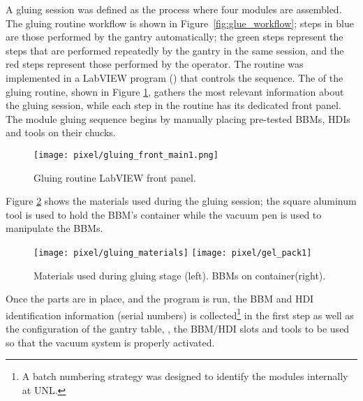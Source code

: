 A gluing session was defined as the process where four modules are assembled. The gluing routine workflow is shown in Figure~\ref{fig:glue_workflow}; steps in blue are those performed by the gantry automatically; the green steps represent the steps that are performed repeatedly by the gantry in the same session, and the red steps represent those performed by the operator. The routine was implemented in a LabVIEW program () that controls the sequence. The  of the gluing routine, shown in Figure \ref{fig:gluing_front_main}, gathers the most relevant information about the gluing session, while each step in the routine has its dedicated front panel. The module gluing sequence begins by manually placing pre-tested BBMs, HDIs and tools on their chucks.

\begin{landscape}
\begin{figure}[h]
  \centering
    \vspace{-2.5cm}
    \hspace{-1cm}
    \texttt{[image: pixel/gluing\_front\_main1.png]}
    \caption[Gluing routine LabVIEW front panel]{Gluing routine LabVIEW front panel.}\label{fig:gluing_front_main}
    \vspace{-2cm}
    \hspace{-2cm}
\end{figure}
\end{landscape}

Figure \ref{fig:gluing_materials} shows the materials used during the gluing session; the square aluminum tool is used to hold the BBM's container while the vacuum pen is used to manipulate the BBMs.

\begin{figure}[h]
\centering
  \texttt{[image: pixel/gluing\_materials]}
  \texttt{[image: pixel/gel\_pack1]}
 \caption[Materials used during gluing stage]{Materials used during gluing stage (left). BBMs on container(right).}\label{fig:gluing_materials}
\end{figure}

Once the parts are in place, and the program is run, the BBM and HDI identification information (serial numbers) is collected\footnote{A batch numbering strategy was designed to identify the modules internally at UNL.} in the first step as well as the configuration of the gantry table, \ie, the BBM/HDI slots and tools to be used so that the vacuum system is properly activated. 

